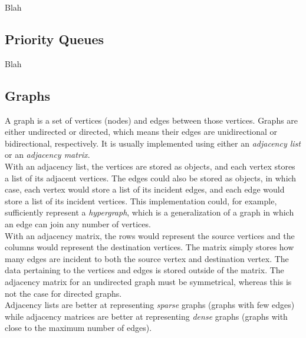 Blah


\subsection{Priority Queues}

Blah


\subsection{Graphs}

A graph is a set of vertices (nodes) and edges between those vertices. Graphs are either undirected or directed, which means their edges are unidirectional or bidirectional, respectively. It is usually implemented using either an \textit{adjacency list} or an \textit{adjacency matrix}. \\

With an adjacency list, the vertices are stored as objects, and each vertex stores a list of its adjacent vertices. The edges could also be stored as objects, in which case, each vertex would store a list of its incident edges, and each edge would store a list of its incident vertices. This implementation could, for example, sufficiently represent a \textit{hypergraph}, which is a generalization of a graph in which an edge can join any number of vertices. \\

With an adjacency matrix, the rows would represent the source vertices and the columns would represent the destination vertices. The matrix simply stores how many edges are incident to both the source vertex and destination vertex. The data pertaining to the vertices and edges is stored outside of the matrix. The adjacency matrix for an undirected graph must be symmetrical, whereas this is not the case for directed graphs. \\

Adjacency lists are better at representing \textit{sparse} graphs (graphs with few edges) while adjacency matrices are better at representing \textit{dense} graphs (graphs with close to the maximum number of edges).

